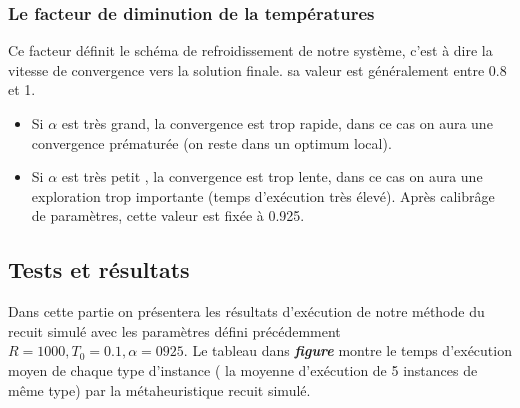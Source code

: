 \documentclass[12pt]{article}
\begin{document}
\subsubsection{Le facteur de diminution de la températures}
Ce facteur définit le schéma de refroidissement de notre système, c’est à dire la vitesse de convergence vers la solution finale.  sa valeur est généralement  entre 0.8 et 1.
\begin{itemize}
    \item Si $ \alpha $ est très grand, la convergence est trop rapide, dans ce cas on aura une convergence prématurée (on reste dans un optimum local).
    \item Si $ \alpha $ est très petit , la convergence est trop lente, dans ce cas on aura une exploration trop importante (temps d'exécution très élevé).
Après calibrâge de paramètres, cette valeur est fixée à 0.925.    
\end{itemize}

\subsection{Tests et résultats }
Dans cette partie on présentera les résultats d'exécution de notre méthode du recuit simulé avec les paramètres défini précédemment \textbf{$R=1000,T_{0}=0.1,\alpha =0925$}.
Le tableau dans \textbf{ \emph{figure } } montre le temps d'exécution moyen de chaque type d’instance 
( la moyenne d'exécution de 5 instances de même type)  par la métaheuristique recuit simulé.
\end{document}
